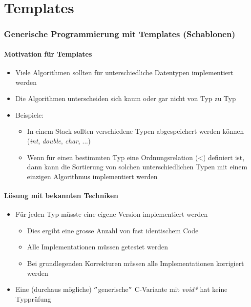 
\part{Templates}

\section{Generische Programmierung mit Templates (Schablonen)}

\subsection{Motivation für Templates}
\begin{itemize}
	\item Viele Algorithmen sollten für unterschiedliche Datentypen implementiert werden
	\item Die Algorithmen unterscheiden sich kaum oder gar nicht von Typ zu Typ
	\item Beispiele:
	\begin{itemize}
		\item In einem Stack sollten verschiedene Typen abgespeichert werden können (\emph{int}, \emph{double}, \emph{char}, ...)
		\item Wenn für einen bestimmten Typ eine Ordnungsrelation (<) definiert ist, dann kann die Sortierung von solchen unterschiedlichen Typen mit einem einzigen Algorithmus implementiert werden
	\end{itemize}
\end{itemize}

\subsection{Lösung mit bekannten Techniken}
\begin{itemize}
	\item Für jeden Typ müsste eine eigene Version implementiert werden
	\begin{itemize}
		\item Dies ergibt eine grosse Anzahl von fast identischem Code
		\item Alle Implementationen müssen getestet werden
		\item Bei grundlegenden Korrekturen müssen alle Implementationen korrigiert werden
	\end{itemize}
	\item Eine (durchaus mögliche) $"$generische$"$ C-Variante mit \emph{void*} hat keine Typprüfung
\end{itemize}

